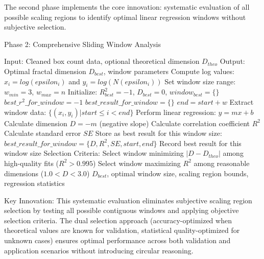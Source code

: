 \documentclass[preprint,12pt]{elsarticle}
\def\textbf#1{#1}%
\def\log{log}%
\def\epsilon{epsilon}%
\begin{document}
The second phase implements the core innovation: systematic evaluation of all possible scaling regions to identify optimal linear regression windows without subjective selection.

\begin{algorithm}[H]
\caption{Phase 2: Comprehensive Sliding Window Analysis}
\label{alg:phase2}
\begin{algorithmic}[1]
\small
\State \textbf{Input:} Cleaned box count data, optional theoretical dimension $D_{theo}$
\State \textbf{Output:} Optimal fractal dimension $D_{best}$, window parameters
\State
\State Compute log values: $x_i = \log(\epsilon_i)$ and $y_i = \log(N(\epsilon_i))$
\State Set window size range: $w_{min} = 3$, $w_{max} = n$
\State Initialize: $R^2_{best} = -1$, $D_{best} = 0$, $window_{best} = \{\}$
\State
{}
    \State $best\_r^2\_for\_window = -1$
    \State $best\_result\_for\_window = \{\}$
    \State
        \State $end = start + w$
        \State Extract window data: $\{(x_i, y_i) | start \leq i < end\}$
        \State
        \State Perform linear regression: $y = mx + b$
        \State Calculate dimension $D = -m$ (negative slope)
        \State Calculate correlation coefficient $R^2$
        \State Calculate standard error $SE$
        \State
            \State Store as best result for this window size:
            \State $best\_result\_for\_window = \{D, R^2, SE, start, end\}$
        \EndIf
    \EndFor
    \State
    \State Record best result for this window size
\EndFor
\State
\State \textbf{Selection Criteria:}
    \State Select window minimizing $|D - D_{theo}|$ among high-quality fits ($R^2 > 0.995$)
\Else
    \State Select window maximizing $R^2$ among reasonable dimensions ($1.0 < D < 3.0$)
\EndIf
\State
\State \Return $D_{best}$, optimal window size, scaling region bounds, regression statistics
\end{algorithmic}
\end{algorithm}

\textbf{Key Innovation}: This systematic evaluation eliminates subjective scaling region selection by testing all possible contiguous windows and applying objective selection criteria. The dual selection approach (accuracy-optimized when theoretical values are known for validation, statistical quality-optimized for unknown cases) ensures optimal performance across both validation and application scenarios without introducing circular reasoning.
\end{document}
